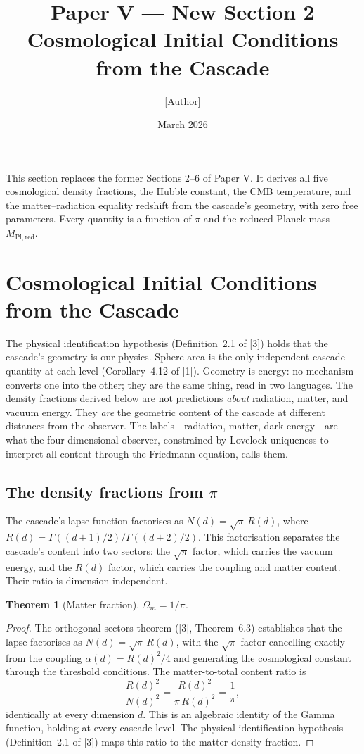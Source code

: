 \documentclass[12pt,a4paper]{article}
\title{Paper V --- New Section 2\\[6pt]
\large Cosmological Initial Conditions from the Cascade}
\author{[Author]}
\date{March 2026}
\newtheorem{theorem}{Theorem}[section]
\theoremstyle{remark}
\begin{document}
\maketitle

\noindent This section replaces the former Sections 2--6 of Paper V. It derives all five cosmological density fractions, the Hubble constant, the CMB temperature, and the matter--radiation equality redshift from the cascade's geometry, with zero free parameters. Every quantity is a function of $\pi$ and the reduced Planck mass $M_{\mathrm{Pl,red}}$.

\setcounter{section}{1}
\section{Cosmological Initial Conditions from the Cascade}

The physical identification hypothesis (Definition~2.1 of [3]) holds that the cascade's geometry is our physics. Sphere area is the only independent cascade quantity at each level (Corollary~4.12 of [1]). Geometry is energy: no mechanism converts one into the other; they are the same thing, read in two languages. The density fractions derived below are not predictions \emph{about} radiation, matter, and vacuum energy. They \emph{are} the geometric content of the cascade at different distances from the observer. The labels---radiation, matter, dark energy---are what the four-dimensional observer, constrained by Lovelock uniqueness to interpret all content through the Friedmann equation, calls them.

\subsection{The density fractions from $\pi$}

The cascade's lapse function factorises as $N(d) = \sqrt{\pi}\, R(d)$, where $R(d) = \Gamma((d+1)/2)/\Gamma((d+2)/2)$. This factorisation separates the cascade's content into two sectors: the $\sqrt{\pi}$ factor, which carries the vacuum energy, and the $R(d)$ factor, which carries the coupling and matter content. Their ratio is dimension-independent.

\begin{theorem}[Matter fraction]\label{thm:omega_m}
$\Omega_m = 1/\pi$.
\end{theorem}

\begin{proof}
The orthogonal-sectors theorem ([3], Theorem~6.3) establishes that the lapse factorises as $N(d) = \sqrt{\pi}\, R(d)$, with the $\sqrt{\pi}$ factor cancelling exactly from the coupling $\alpha(d) = R(d)^2/4$ and generating the cosmological constant through the threshold conditions. The matter-to-total content ratio is
\[
\frac{R(d)^2}{N(d)^2} = \frac{R(d)^2}{\pi\, R(d)^2} = \frac{1}{\pi},
\]
identically at every dimension $d$. This is an algebraic identity of the Gamma function, holding at every cascade level. The physical identification hypothesis (Definition~2.1 of [3]) maps this ratio to the matter density fraction.
\end{proof}
\end{document}
